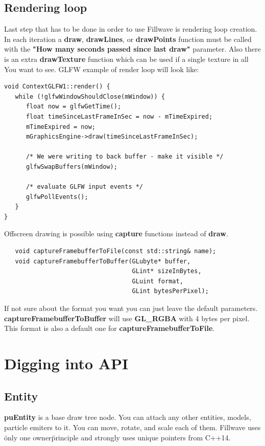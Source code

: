 \documentclass{article}
\begin{document}
\subsection{Rendering loop}\label{sec:Loop}

\indent \indent Last step that has to be done in order to use Fillwave is rendering loop creation. In each iteration a \textbf{draw}, \textbf{drawLines}, or \textbf{drawPoints} function must be called with the \textbf{"How many seconds passed since last draw"} parameter. Also there is an extra \textbf{drawTexture} function which can be used if a single texture in all You want to see. GLFW example of render loop will look like:

\begin{lstlisting}
void ContextGLFW1::render() {
   while (!glfwWindowShouldClose(mWindow)) {
      float now = glfwGetTime();
      float timeSinceLastFrameInSec = now - mTimeExpired;
      mTimeExpired = now;
      mGraphicsEngine->draw(timeSinceLastFrameInSec);

      /* We were writing to back buffer - make it visible */
      glfwSwapBuffers(mWindow);
      
      /* evaluate GLFW input events */
      glfwPollEvents();
   }
}
\end{lstlisting}

\indent Offscreen drawing is possible using \textbf{capture} functions instead of \textbf{draw}.

\begin{lstlisting}
   void captureFramebufferToFile(const std::string& name);
   void captureFramebufferToBuffer(GLubyte* buffer,
                                   GLint* sizeInBytes,
                                   GLuint format,
                                   GLint bytesPerPixel);
\end{lstlisting}
\indent \indent If not sure about the format you want you can just leave the default parameters. \textbf{captureFramebufferToBuffer} will use \textbf{GL\_RGBA} with 4 bytes per pixel. This format is also a default one for \textbf{captureFramebufferToFile}.

\section{Digging into API}

\subsection{Entity}\label{sec:Entity}
\indent \indent \textbf{puEntity} is a base draw tree node. You can attach any other entities, models, particle emiters to it. You can move, rotate, and scale each of them. Fillwave uses \"only one owner\" principle and strongly uses unique pointers from C++14.
\end{document}
